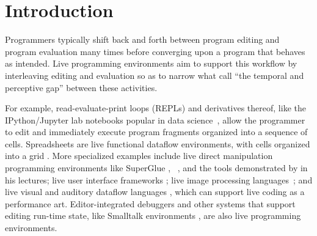 \vspace{-5px}
\newcommand{\introSec}{Introduction}
\section{\protect\introSec} %
\label{sec:intro}


Programmers typically shift back and forth between program editing and program evaluation many times before converging upon a program that behaves as intended. 
Live programming environments aim to support this workflow by interleaving editing and evaluation so as to   
narrow what \citet{burckhardt2013s} call ``the temporal and perceptive gap'' between these activities.

For example, read-evaluate-print loops (REPLs) and derivatives thereof, like the IPython/Jupyter lab notebooks popular in data science~\cite{PER-GRA:2007}, allow the programmer to edit and immediately execute program fragments organized into a sequence of cells. 
Spreadsheets are live functional dataflow environments, with cells organized into a grid \cite{DBLP:journals/jfp/Wakeling07}. 
More specialized examples include live direct manipulation programming environments like SuperGlue
\cite{McDirmid:2007}, \sns{}~\cite{sns-pldi,sns-uist}, and the tools
demonstrated by \citet{victor2012inventing} in his lectures;
%
live user interface frameworks \cite{burckhardt2013s};
%
live image processing languages~\cite{DBLP:journals/vlc/Tanimoto90};
%
and live visual and auditory dataflow languages \cite{DBLP:conf/vl/BurnettAW98}, which can support live coding as a performance art.
Editor-integrated debuggers \cite{mccauley2008debugging} and other systems that support editing run-time state, like Smalltalk environments \cite{Goldberg:1983cn}, are also live programming environments. 

